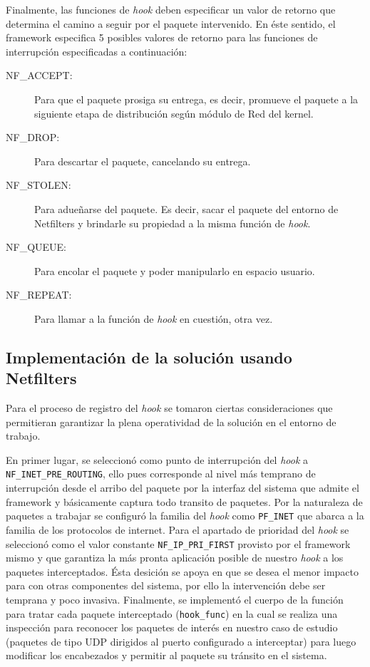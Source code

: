 Finalmente, las funciones de \emph{hook} deben especificar un valor de retorno que determina el camino a seguir por el paquete intervenido. En éste sentido, el framework especifica 5 posibles valores de retorno para las funciones de interrupción especificadas a continuación:
\begin{description}
\item[NF\_ACCEPT:] Para que el paquete prosiga su entrega, es decir, promueve el paquete a la siguiente etapa de distribución según módulo de Red del kernel.
\item[NF\_DROP:] Para descartar el paquete, cancelando su entrega.
\item[NF\_STOLEN:] Para adueñarse del paquete. Es decir, sacar el paquete del entorno de Netfilters y brindarle su propiedad a la misma función de \emph{hook}.
\item[NF\_QUEUE:] Para encolar el paquete y poder manipularlo en espacio usuario.
\item[NF\_REPEAT:] Para llamar a la función de \emph{hook} en cuestión, otra vez.
\end{description}

\subsection{Implementación de la solución usando Netfilters}
Para el proceso de registro del \emph{hook} se tomaron ciertas consideraciones que permitieran garantizar la plena operatividad de la solución en el entorno de trabajo.

En primer lugar, se seleccionó como punto de interrupción del \emph{hook} a \verb=NF_INET_PRE_ROUTING=, ello pues corresponde al nivel más temprano de interrupción desde el arribo del paquete por la interfaz del sistema que admite el framework y básicamente captura todo transito de paquetes. Por la naturaleza de paquetes a trabajar se configuró la familia del \emph{hook} como \verb=PF_INET= que abarca a la familia de los protocolos de internet. Para el apartado de prioridad del \emph{hook} se seleccionó como el valor constante \verb=NF_IP_PRI_FIRST= provisto por el framework mismo y que garantiza la más pronta aplicación posible de nuestro \emph{hook} a los paquetes interceptados. Ésta desición se apoya en que se desea el menor impacto para con otras componentes del sistema, por ello la intervención debe ser temprana y poco invasiva. Finalmente, se implementó el cuerpo de la función para tratar cada paquete interceptado (\verb=hook_func=) en la cual se realiza una inspección para reconocer los paquetes de interés en nuestro caso de estudio (paquetes de tipo UDP dirigidos al puerto configurado a interceptar) para luego modificar los encabezados y permitir al paquete su tránsito en el sistema.

